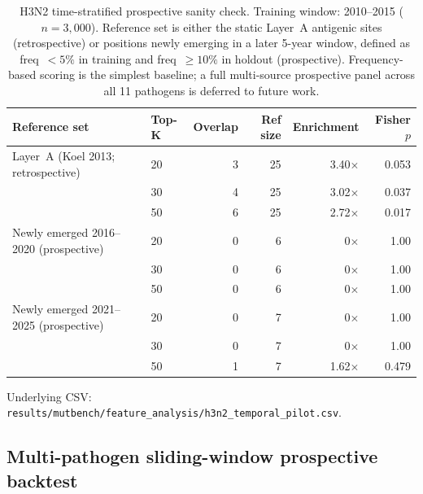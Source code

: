 \begin{table}[htbp]
\centering
\caption{H3N2 time-stratified prospective sanity check. Training window: 2010--2015 ($n=3{,}000$). Reference set is either the static Layer~A antigenic sites (retrospective) or positions newly emerging in a later 5-year window, defined as freq~$<5\%$ in training and freq~$\geq 10\%$ in holdout (prospective). Frequency-based scoring is the simplest baseline; a full multi-source prospective panel across all 11 pathogens is deferred to future work.}
\label{tab:h3n2_temporal_pilot}
\footnotesize
\begin{tabular}{llrrrr}
\toprule
\textbf{Reference set} & \textbf{Top-K} & \textbf{Overlap} & \textbf{Ref size} & \textbf{Enrichment} & \textbf{Fisher $p$} \\
\midrule
Layer~A (Koel 2013; retrospective)        & 20 & 3 & 25 & 3.40$\times$ & 0.053 \\
                                          & 30 & 4 & 25 & 3.02$\times$ & 0.037 \\
                                          & 50 & 6 & 25 & 2.72$\times$ & 0.017 \\
\midrule
Newly emerged 2016--2020 (prospective)    & 20 & 0 &  6 & 0$\times$    & 1.00 \\
                                          & 30 & 0 &  6 & 0$\times$    & 1.00 \\
                                          & 50 & 0 &  6 & 0$\times$    & 1.00 \\
\midrule
Newly emerged 2021--2025 (prospective)    & 20 & 0 &  7 & 0$\times$    & 1.00 \\
                                          & 30 & 0 &  7 & 0$\times$    & 1.00 \\
                                          & 50 & 1 &  7 & 1.62$\times$ & 0.479 \\
\bottomrule
\end{tabular}
\begin{minipage}{\textwidth}
\smallskip
\footnotesize Underlying CSV: \texttt{results/mutbench/feature\_analysis/h3n2\_temporal\_pilot.csv}.
\end{minipage}
\end{table}

\subsection{Multi-pathogen sliding-window prospective backtest}
\label{subsec:sliding_window_backtest}

